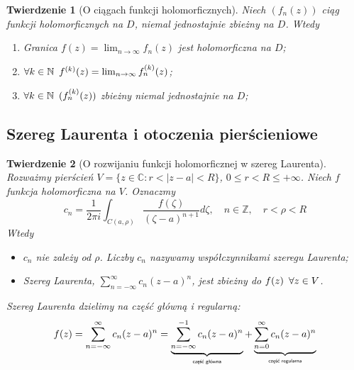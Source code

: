 \documentclass[11pt]{article}
\newcommand{\abs}[1]{\left|#1\right|} %
\theoremstyle{plain}
\newtheorem*{theorem}{Twierdzenie}
\theoremstyle{definition}
\theoremstyle{remark}
\begin{document}
\begin{theorem}[O ciągach funkcji holomorficznych]
  Niech $ (f_n(z)) $ ciąg funkcji holomorficznych na $D$, niemal jednostajnie zbieżny na $D$. Wtedy

  \begin{enumerate}
    \item Granica $ f(z) = \lim_{n \to \infty} f_n(z) $ jest holomorficzna na $ D $; \label{ciagi-holo-f}
    \item $ \forall k \in \mathbb{N}\enskip f^{(k)}(z) = \lim_{n \to \infty} f_n^{(k)}(z) $; \label{ciagi-holo-pochodne}
    \item $ \forall k \in \mathbb{N}\enskip (f_n^{(k)}(z)) $ zbieżny niemal jednostajnie na $D$; \label{ciagi-holo-pochodne-zb}
  \end{enumerate}
\end{theorem}

\subsection{Szereg Laurenta i otoczenia pierścieniowe}

\begin{theorem}[O rozwijaniu funkcji holomorficznej w szereg Laurenta]
  Rozważmy pierścień $ V = \{z \in \mathbb{C}\colon r < \abs{z-a} < R\} $, $ 0 \leq r < R \leq +\infty $.
  Niech $ f $ funkcja holomorficzna na $ V $.
  Oznaczmy
  $$
    c_n = \frac{1}{2 \pi i} \int_{C(a, \rho)} \frac{f(\zeta)}{(\zeta - a)^{n+1}} d\zeta,
    \quad
    n \in \mathbb{Z},
    \quad
    r < \rho < R
  $$
  Wtedy

  \begin{itemize}
    \item $ c_n $ nie zależy od $ \rho $. Liczby $ c_n $ nazywamy współczynnikami szeregu Laurenta;
    \item Szereg Laurenta, $ \sum_{n = -\infty}^{\infty} c_n(z-a)^n $, jest zbieżny do $ f(z) \enskip \forall z \in V $.
  \end{itemize}

  Szereg Laurenta dzielimy na część główną i regularną:
  $$
    f(z) =
    \sum_{n = -\infty}^{\infty} c_n(z-a)^n =
    \underbrace{\sum_{n = -\infty}^{-1} c_n(z-a)^n}_\text{\normalfont\tiny\sffamily część główna} +
    \underbrace{\sum_{n = 0}^{\infty} c_n(z-a)^n}_\text{\normalfont\tiny\sffamily część regularna}
  $$
\end{theorem}
\end{document}
